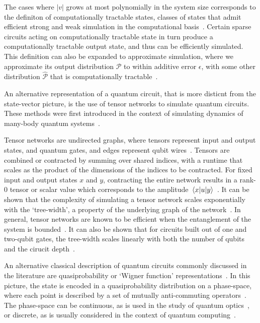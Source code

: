 The cases where $\left|v\right|$ grows at most polynomially in the system size corresponds to the definiton of computationally tractable states, classes of states that admit efficient strong and weak simulation in the computational basis~\cite{VandenNest2009}. Certain sparse circuits acting on computationally tractable state in turn produce a computationally tractable output state, and thus can be efficiently simulated. This definition can also be expanded to approximate simulation, where we approximate its output distribution $\mathcal{P}$ to within additive error $\epsilon$, with some other distribution $\mathcal{\hat{P}}$ that is computationally tractable~\cite{Schwarz2013}.\par
An alternative representation of a quantum circuit, that is more disticnt from the state-vector picture, is the use of tensor networks to simulate quantum circuits. These methods were first introduced in the context of simulating dynamics of many-body quantum systems~\cite{Vidal2003}.\par
Tensor networks are undirected graphs, where tensors represent input and output states, and quantum gates, and edges represent qubit wires~\cite{Markov2005}. Tensors are combined or contracted by summing over shared indices, with a runtime that scales as the product of the dimensions of the indices to be contracted. For fixed input and output states $x$ and $y$, contracting the entire network results in a rank-0 tensor or scalar value which corresponds to the amplitude $\matrixel{x}{u}{y}$~\cite{Markov2005}. It can be shown that the complexity of simulating a tensor network scales exponentially with the `tree-width', a property of the underlying graph of the network~\cite{Markov2005}. In general, tensor networks are known to be efficient when the entanglement of the system is bounded~\cite{Vidal2003}. It can also be shown that for circuits built out of one and two-qubit gates, the tree-width scales linearly with both the number of qubits and the cirucit depth~\cite{Markov2005}.\par
An alternative classical description of quantum circuits commonly discussed in the literature are quasiprobability or `Wigner function' representations~\cite{Wootters1987}. In this picture, the state is encoded in a quasiprobability distribution on a phase-space, where each point is described by a set of mutually anti-commuting operators~\cite{Wootters1987}. The phase-space can be continuous, as is used in the study of quantum optics~\cite{Nielsen2000}, or discrete, as is usually considered in the context of quantum computing~\cite{Gross2006}.\par
